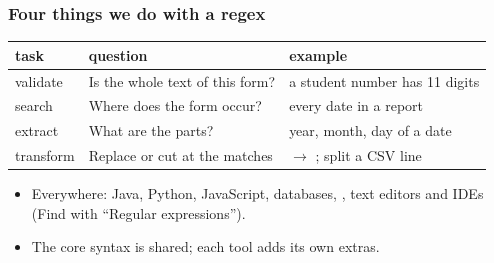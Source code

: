 \documentclass[aspectratio=169,10pt,compress]{beamer}
\begin{document}
\begin{frame}[t,fragile] \frametitle{Four things we do with a regex}
  \begin{center}\small
  \begin{tabular}{@{}L{0.16\textwidth}L{0.38\textwidth}L{0.38\textwidth}@{}}
    \toprule
    \textbf{task}      & \textbf{question}                                  & \textbf{example} \\
    \midrule
    validate           & Is the whole text of this form?                    & a student number has 11 digits \\
    search             & Where does the form occur?                         & every date in a report \\
    extract            & What are the parts?                                & year, month, day of a date \\
    transform          & Replace or cut at the matches                      &  $\to$ ; split a CSV line \\
    \bottomrule
  \end{tabular}
  \end{center}
  \begin{itemize}\small
    \item Everywhere: Java, Python, JavaScript, databases, , text editors and IDEs (Find with ``Regular expressions'').
    \item The core syntax is shared; each tool adds its own extras.
  \end{itemize}
\end{frame}

\end{document}
